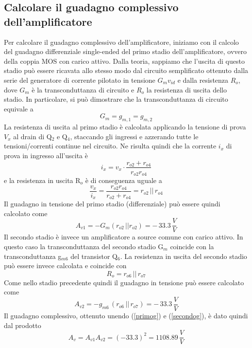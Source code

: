 \documentclass[a4paper,10pt]{article}
\begin{document}
\subsection{Calcolare il guadagno complessivo dell'amplificatore}
Per calcolare il guadagno complessivo dell'amplificatore, iniziamo con il calcolo del guadagno differenziale single-ended del primo stadio dell'amplificatore, ovvero della coppia MOS con carico attivo. Dalla teoria, sappiamo che l'uscita di questo stadio può essere ricavata allo stesso modo dal circuito semplificato ottenuto dalla serie del generatore di corrente pilotato in tensione $G_m v_{id} $ e dalla resistenza $R_o$, dove $G_m$ è la transconduttanza di circuito e $R_o$ la resistenza di uscita dello stadio. In particolare, si può dimostrare che la transconduttanza di circuito equivale a
\begin{equation*}
G_m = g_{m,1} = g_{m,2}
\end{equation*}
La resistenza di uscita al primo stadio è calcolata applicando la tensione di prova $V_x$ al drain di Q$_2$ e Q$_4$, staccando gli ingressi e azzerando tutte le tensioni/correnti continue nel circuito. Ne risulta quindi che la corrente $i_x$ di prova in ingresso all'uscita è
\begin{equation*}
i_x = v_x \cdot \frac{r_{o2} + r_{o4}}{r_{o2}r_{o4}}
\end{equation*}
e la resistenza in uscita R$_o$ è di conseguenza uguale a
\begin{equation*}
\frac{v_x}{i_x} = \frac{r_{o2}r_{o4}}{r_{o2} + r_{o4}} = r_{o2}\, ||\, r_{o4}
\end{equation*}
Il guadagno in tensione del primo stadio (differenziale) può essere quindi calcolato come
\begin{equation}
\label{primog}
A_{v1} = - G_m(r_{o2} \, || r_{o2}) = -\,33.3 \, \frac{V}{V}
\end{equation}
Il secondo stadio è invece un amplificatore a source comune con carico attivo. In questo caso la transconduttanza del secondo stadio G$_m$ coincide con la transconduttanza g$_{m6}$ del transistor Q$_6$. La resistenza in uscita del secondo stadio può essere invece calcolata e coincide con
\begin{equation*}
R_{o}=r_{o6} \, || \, r_{o7}
\end{equation*}
Come nello stadio precedente quindi il guadagno in tensione può essere calcolato come
\begin{equation}
\label{secondog}
A_{v2} = - g_{m6}\,(r_{o6} \, || \, r_{o7}) = -\,33.3 \, \frac{V}{V}
\end{equation}
Il guadagno complessivo, ottenuto unendo (\ref{primog}) e (\ref{secondog}), è dato quindi dal prodotto
\begin{equation}
A_v = A_{v1}A_{v2} = (-33.3)^2 = 1108.89\, \frac{V}{V}
\end{equation}
\end{document}
